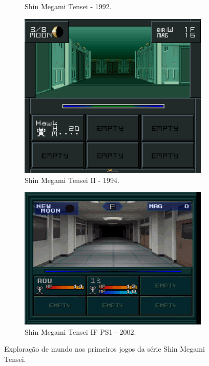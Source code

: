 \documentclass[
	12pt,				%
	openright,			%
	twoside,			%
	a4paper,			%
	english,			%
	french,				%
	spanish,			%
	brazil				%
	]{abntex2}
\begin{document}
\begin{figure}[h!]
\begin{subfigure}[b]{0.4\linewidth}
    \caption{Shin Megami Tensei - 1992.}
  \end{subfigure}
  \begin{subfigure}[b]{0.4\linewidth}
    \includegraphics[width=\linewidth]{smt2.jpg}
    \caption{Shin Megami Tensei II - 1994.}
  \end{subfigure}
  \begin{subfigure}[b]{0.4\linewidth}
    \includegraphics[width=\linewidth]{smtif.jpg}
    \caption{Shin Megami Tensei IF PS1 - 2002.}
  \end{subfigure}
  \caption{Exploração de mundo nos primeiros jogos da série Shin Megami Tensei.}
  \label{fig:smt}
\end{figure}
\end{document}
